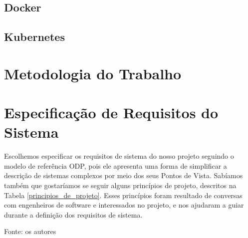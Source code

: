 \documentclass[twosideprint]{politex}
\newcommand{\legend}[1]{\begin{center}\def\caption{}\caption{#1}\end{center}}
\begin{document}
	\section{Docker}
	\section{Kubernetes}
	

\chapter{Metodologia do Trabalho}

\chapter{Especificação de Requisitos do Sistema}
    Escolhemos especificar os requisitos de sistema do nosso projeto seguindo o modelo de referência ODP, pois ele apresenta uma forma de simplificar a descrição de sistemas complexos por meio dos seus Pontos de Vista.\cite{odppart1} Sabíamos também que gostaríamos se seguir alguns princípios de projeto, descritos na Tabela \ref{principios_de_projeto}. Esses princípios foram resultado de conversas com engenheiros de software e interessados no projeto, e nos ajudaram a guiar durante a definição dos requisitos de sistema.
    \begin{table}[]
        \centering
        \caption{Princípios de Projeto}
        \label{principios_de_projeto}
        \legend{Fonte: os autores}
    \end{table}
\end{document}
